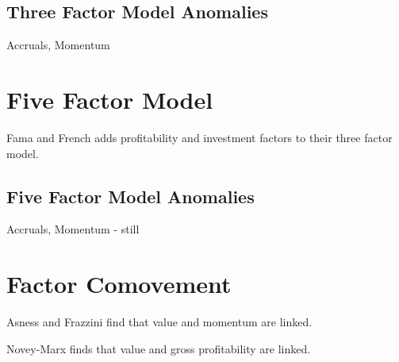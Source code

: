 \subsection{Three Factor Model Anomalies}

Accruals, Momentum

\section{Five Factor Model}

Fama and French\cite{fama2016dissecting} adds profitability and investment
factors to their three factor model.

\subsection{Five Factor Model Anomalies}

Accruals, Momentum - still

\section{Factor Comovement}

Asness and Frazzini\cite{asness2013devil} find that value and momentum are
linked.

Novey-Marx\cite{novy2013other} finds that value and gross profitability are
linked.
